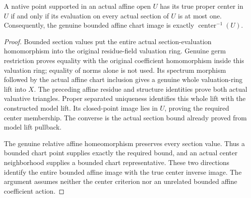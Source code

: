 \begin{theorem}
\label{scheme:proper-center-bounded-affine-criterion}
\leanok
{}
A native point supported in an actual affine open $U$ has its true proper
center in $U$ if and only if its evaluation on every actual section of
$U$ is at most one. Consequently, the genuine bounded affine chart image
is exactly $\operatorname{center}^{-1}(U)$.
\end{theorem}
\begin{proof}
Bounded section values put the entire actual section-evaluation
homomorphism into the original residue-field valuation ring.
Genuine germ restriction proves equality with the original coefficient
homomorphism inside this valuation ring; equality of norms alone is
not used. Its spectrum morphism followed by the actual affine chart
inclusion gives a genuine whole valuation-ring lift into $X$.
The preceding affine residue and structure identities prove both actual
valuative triangles. Proper separated uniqueness identifies this whole
lift with the constructed model lift. Its closed-point image
lies in $U$, proving the required center membership. The converse is
the actual section bound already proved from model lift pullback.

The genuine relative affine homeomorphism preserves every section value.
Thus a bounded chart point supplies exactly the required bound, and an
actual center neighborhood supplies a bounded chart representative.
These two directions identify the entire bounded affine image with the
true center inverse image. The argument assumes neither the center
criterion nor an unrelated bounded affine coefficient action.
\end{proof}

